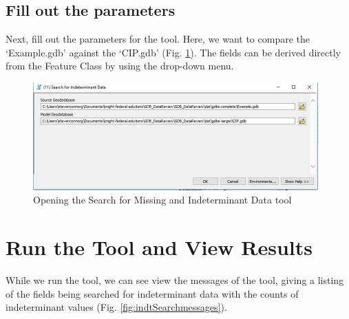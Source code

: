 \documentclass[openany]{book}
\theoremstyle{definition}
\theoremstyle{definition}
\theoremstyle{definition}
\theoremstyle{remark}
\begin{document}
\subsection{Fill out the parameters}\label{fill-out-the-parameters-9}

Next, fill out the parameters for the tool. Here, we want to compare the
`Example.gdb' against the `CIP.gdb' (Fig. \ref{fig:indtSearchparams}).
The fields can be derived directly from the Feature Class by using the
drop-down menu.

\begin{figure}[H]

{\centering \includegraphics[width=4.31in,]{figures/indtSearch-params} 

}

\caption{Opening the Search for Missing and Indeterminant Data tool}\label{fig:indtSearchparams}
\end{figure}

\section{Run the Tool and View
Results}\label{run-the-tool-and-view-results-9}

While we run the tool, we can see view the messages of the tool, giving
a listing of the fields being searched for indeterminant data with the
counts of indeterminant values (Fig. \ref{fig:indtSearchmessages}).
\end{document}
